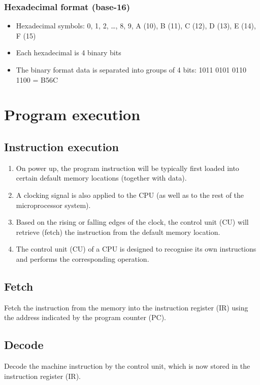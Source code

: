\documentclass[11pt]{article}
\begin{document}
\subsubsection{Hexadecimal format (base-16)}
\label{sec:orgbdb1e1f}
\begin{itemize}
\item Hexadecimal symbols: 0, 1, 2, \ldots{}, 8, 9, A (10), B (11), C (12), D (13), E (14), F (15)
\item Each hexadecimal is 4 binary bits
\item The binary format data is separated into groups of 4 bits:
1011 0101 0110 1100 = B56C
\end{itemize}
\section{Program execution}
\label{sec:org4060c03}

\subsection{Instruction execution}
\label{sec:orgacc8dda}
\begin{enumerate}
\item On power up, the program instruction will be typically first loaded into certain default memory locations (together with data).
\item A clocking signal is also applied to the CPU (as well as to the rest of the microprocessor system).
\item Based on the rising or falling edges of the clock, the control unit (CU) will retrieve (fetch) the instruction from the default memory location.
\item The control unit (CU) of a CPU is designed to recognise its own instructions and performs the corresponding operation.
\end{enumerate}

 \newpage
\subsection{Fetch}
\label{sec:orgfb5fce9}
Fetch the instruction from the memory into the instruction register (IR) using the address indicated by the program counter (PC).
\subsection{Decode}
\label{sec:org6839845}
Decode the machine instruction by the control unit, which is now stored in the instruction register (IR).
\end{document}
